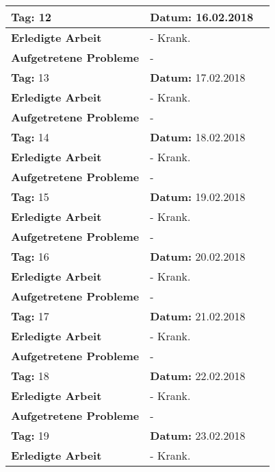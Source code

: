 \begin{longtable}{|p{5cm}|p{5cm}p{6cm}|}
\rowcolor{heading}\textbf{Tag:} 12 & \textbf{Datum:} 16.02.2018 & \\ \hline
\textbf{Erledigte Arbeit} & \multicolumn{2}{p{11cm}|}{- Krank.} \\ \hline
\textbf{Aufgetretene Probleme} & \multicolumn{2}{p{11cm}|}{-} \\ \hline
\rowcolor{heading}\textbf{Tag:} 13 & \textbf{Datum:} 17.02.2018 & \\ \hline
\textbf{Erledigte Arbeit} & \multicolumn{2}{p{11cm}|}{- Krank.} \\ \hline
\textbf{Aufgetretene Probleme} & \multicolumn{2}{p{11cm}|}{-} \\ \hline
\rowcolor{heading}\textbf{Tag:} 14 & \textbf{Datum:} 18.02.2018 & \\ \hline
\textbf{Erledigte Arbeit} & \multicolumn{2}{p{11cm}|}{- Krank.} \\ \hline
\textbf{Aufgetretene Probleme} & \multicolumn{2}{p{11cm}|}{-} \\ \hline
\rowcolor{heading}\textbf{Tag:} 15 & \textbf{Datum:} 19.02.2018 & \\ \hline
\textbf{Erledigte Arbeit} & \multicolumn{2}{p{11cm}|}{- Krank.} \\ \hline
\textbf{Aufgetretene Probleme} & \multicolumn{2}{p{11cm}|}{-} \\ \hline
\rowcolor{heading}\textbf{Tag:} 16 & \textbf{Datum:} 20.02.2018 & \\ \hline
\textbf{Erledigte Arbeit} & \multicolumn{2}{p{11cm}|}{- Krank.} \\ \hline
\textbf{Aufgetretene Probleme} & \multicolumn{2}{p{11cm}|}{-} \\ \hline
\rowcolor{heading}\textbf{Tag:} 17 & \textbf{Datum:} 21.02.2018 & \\ \hline
\textbf{Erledigte Arbeit} & \multicolumn{2}{p{11cm}|}{- Krank.} \\ \hline
\textbf{Aufgetretene Probleme} & \multicolumn{2}{p{11cm}|}{-} \\ \hline
\rowcolor{heading}\textbf{Tag:} 18 & \textbf{Datum:} 22.02.2018 & \\ \hline
\textbf{Erledigte Arbeit} & \multicolumn{2}{p{11cm}|}{- Krank.} \\ \hline
\textbf{Aufgetretene Probleme} & \multicolumn{2}{p{11cm}|}{-} \\ \hline
\rowcolor{heading}\textbf{Tag:} 19 & \textbf{Datum:} 23.02.2018 & \\ \hline
\textbf{Erledigte Arbeit} & \multicolumn{2}{p{11cm}|}{- Krank.} \\ \hline

\end{longtable}
